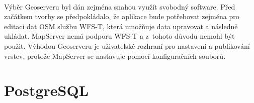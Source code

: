 \documentclass[11pt,a4paper,titlepage,oneside]{book}
\begin{document}



		\paragraph{} Výběr Geoserveru byl dán zejména snahou využít svobodný software. Před začátkem tvorby se předpokládalo, že aplikace bude potřebovat zejména pro editaci dat \ac{OSM} službu \ac{WFS-T}, která umožňuje data upravovat a následně ukládat. MapServer nemá podporu \ac{WFS-T} a z~tohoto důvodu nemohl být použit. Výhodou Geoserveru je uživatelské rozhraní pro nastavení a publikování vrstev, protože MapServer se nastavuje pomocí konfiguračních souborů.

	\section{PostgreSQL}






\end{document}
